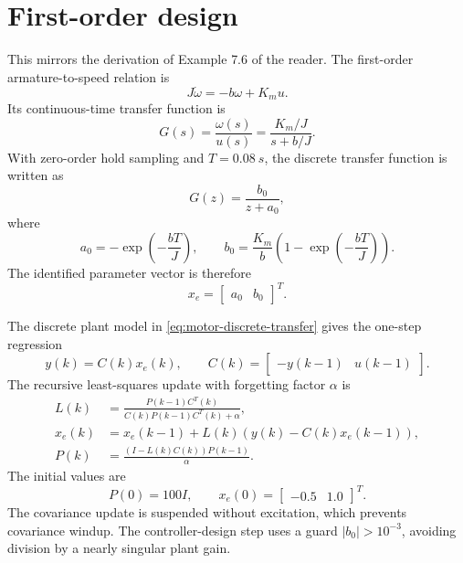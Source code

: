 \section{First-order design}\label{sec:first-order}

This mirrors the derivation of Example 7.6 of the reader. The first-order
armature-to-speed relation is
\begin{equation}
  J\dot{\omega}=-b\omega+K_m u .
  \label{eq:motor-differential-equation}
\end{equation}
Its continuous-time transfer function is
\begin{equation}
  G(s)=\frac{\omega(s)}{u(s)}
      =\frac{K_m/J}{s+b/J}.
  \label{eq:motor-continuous-transfer}
\end{equation}
With zero-order hold sampling and \(T=\SI{0.08}{s}\), the discrete transfer
function is written as
\begin{equation}
  G(z)=\frac{b_0}{z+a_0},
  \label{eq:motor-discrete-transfer}
\end{equation}
where
\begin{equation}
  a_0=-\exp\!\left(-\frac{bT}{J}\right),
  \qquad
  b_0=\frac{K_m}{b}
      \left(1-\exp\!\left(-\frac{bT}{J}\right)\right).
  \label{eq:motor-discrete-parameters}
\end{equation}
The identified parameter vector is therefore
\begin{equation}
  x_e=\begin{bmatrix}a_0 & b_0\end{bmatrix}^{T}.
  \label{eq:identified-parameter-vector}
\end{equation}

The discrete plant model in \eqref{eq:motor-discrete-transfer} gives the
one-step regression
\begin{equation}
  y(k)=C(k)x_e(k),
  \qquad
  C(k)=\begin{bmatrix}-y(k-1) & u(k-1)\end{bmatrix}.
  \label{eq:rls-regression}
\end{equation}
The recursive least-squares update with forgetting factor \(\alpha\) is
\begin{align}
  L(k) &=
  \frac{P(k-1)C^{T}(k)}
       {C(k)P(k-1)C^{T}(k)+\alpha},
  \label{eq:rls-gain}\\
  x_e(k) &= x_e(k-1)+L(k)\left(y(k)-C(k)x_e(k-1)\right),
  \label{eq:rls-parameter-update}\\
  P(k) &= \frac{\left(I-L(k)C(k)\right)P(k-1)}{\alpha}.
  \label{eq:rls-covariance-update}
\end{align}
The initial values are
\begin{equation}
  P(0)=100I,
  \qquad
  x_e(0)=\begin{bmatrix}-0.5&1.0\end{bmatrix}^{T}.
  \label{eq:rls-initialisation}
\end{equation}
The covariance update is suspended without excitation, which
prevents covariance windup. The controller-design step uses a guard
\(|b_0|>10^{-3}\), avoiding division by a nearly singular plant gain.

